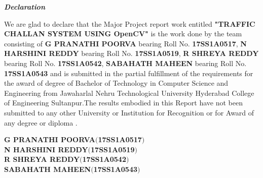 \documentclass[12pt,a4paper]{report}
\begin{document}
\begin{center}
\textbf{\textit{\Large Declaration}}
\end{center}
\vspace{.5 cm}
\begin{description}
\large
We are glad to declare that the Major Project report work entitled \textbf{"TRAFFIC CHALLAN SYSTEM USING OpenCV"} is the work done by the team consisting of \textbf{G PRANATHI POORVA}  bearing Roll No.  \textbf{17SS1A0517}, \textbf{ N HARSHINI REDDY} bearing Roll No.
\textbf{17SS1A0519}, \textbf{R SHREYA REDDY} bearing Roll No.
\textbf{17SS1A0542}, \textbf{SABAHATH MAHEEN} bearing Roll No.
\textbf{17SS1A0543} and is submitted in the partial fulfillment of the requirements for the award of degree of Bachelor of Technology in Computer Science and Engineering from Jawaharlal Nehru Technological University Hyderabad College of Engineering Sultanpur.The results embodied in this Report have not been submitted to any other University or Institution for Recognition or for Award of any degree or diploma .
\end{description}
\vspace{0.01cm}
\begin{flushright}
\textbf{\large G PRANATHI POORVA\hspace{0.2in}$ ( $17SS1A0517$)$}\\
\textbf{\large N HARSHINI REDDY\hspace{0.2in}$ ( $17SS1A0519$)$}\\
\textbf{\large R SHREYA REDDY\hspace{0.2in}$ ( $17SS1A0542$)$}\\
\textbf{\large SABAHATH MAHEEN\hspace{0.2in}$ ( $17SS1A0543$)$}
\end{flushright}

\newpage
{}
\end{document}
